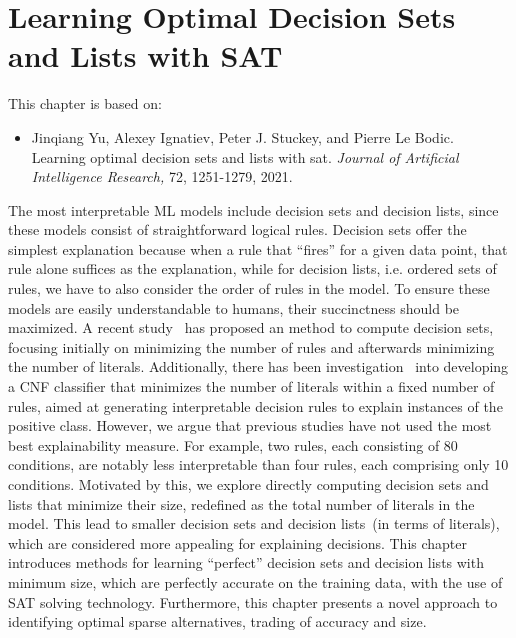 \chapter{Learning Optimal Decision Sets and Lists with SAT}\label{chap:jair21}


This chapter is based on:
\begin{itemize}
	\item Jinqiang Yu, Alexey Ignatiev, Peter J. Stuckey, and Pierre Le Bodic. Learning optimal decision
sets and lists with sat. \emph{Journal of Artificial Intelligence Research,} 72, 1251-1279, 2021.
\end{itemize}

The most interpretable ML models include decision sets and decision lists,
since these models consist of straightforward logical rules.
%
Decision sets offer the simplest explanation because when a rule that ``fires'' for a given data
point, that rule alone suffices as the explanation, 
while for decision lists, i.e. ordered sets of rules, we have to also
consider the order of rules in the model.
%
To ensure these models are easily understandable to humans, 
their succinctness should be maximized.
%
A recent study~\cite{ipnms-ijcar18} has proposed an method to compute decision sets, focusing initially on minimizing the number of 
rules and afterwards minimizing the number of literals.
%
Additionally, there has been investigation~\cite{meel-cp18,meel-aies19}
into developing a CNF classifier 
that minimizes the number of literals within a fixed number of rules,
aimed at generating interpretable decision rules to explain instances of the positive class.
%
However, we argue that previous studies have not used the most best explainability measure.
%
For example, two rules, each consisting of 80 conditions, are notably less interpretable
than four rules, each comprising only 10 conditions.
%
Motivated by this, we explore directly computing decision sets and lists 
that minimize their size, redefined as the total number of literals in the model.
%
This lead to smaller decision sets and decision lists~(in terms of literals),
which are considered more appealing for explaining decisions.
%
This chapter introduces methods for learning ``perfect'' decision sets and decision lists with
minimum size, which are perfectly accurate on the training data, with the use of SAT solving technology.
%
Furthermore, this chapter presents a novel approach to identifying optimal sparse alternatives, 
trading of accuracy and size.



